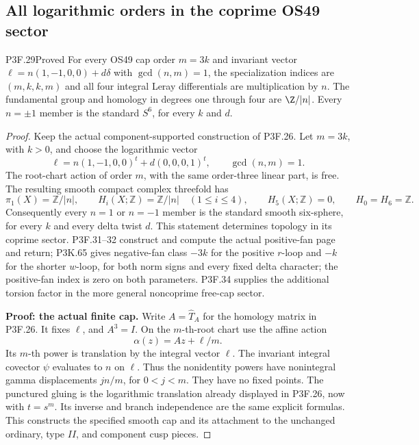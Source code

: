 \subsection{All logarithmic orders in the coprime OS49 sector}
\begin{statement}{P3F.29}{Proved}
For every OS49 cap order $m=3k$ and invariant vector $\ell=n(1,-1,0,0)+d\delta$ with $\gcd(n,m)=1$, the specialization indices are $(m,k,k,m)$ and all four integral Leray differentials are multiplication by $n$. The fundamental group and homology in degrees one through four are $\Z/|n|$. Every $n=\pm1$ member is the standard $S^6$, for every $k$ and $d$.
\end{statement}
\begin{proof}
Keep the actual component-supported construction of P3F.26. Let \(m=3k\), with \(k>0\), and choose the logarithmic vector \[
 \ell=n(1,-1,0,0)^t+d(0,0,0,1)^t,
 \qquad \gcd(n,m)=1.                                  \tag{P3F.29.1}
\] The root-chart action of order \(m\), with the same order-three linear part, is free. The resulting smooth compact complex threefold has \[
 \pi_1(X)=\mathbb Z/|n|,
 \qquad H_i(X;\mathbb Z)=\mathbb Z/|n|
       \quad(1\leq i\leq4),
 \qquad H_5(X;\mathbb Z)=0,
 \qquad H_0=H_6=\mathbb Z.                            \tag{P3F.29.2}
\] Consequently every \(n=1\) or \(n=-1\) member is the standard smooth six-sphere, for every \(k\) and every delta twist \(d\). This statement determines topology in its coprime sector. P3F.31--32 construct and compute the actual positive-fan page and return; P3K.65 gives negative-fan class \(-3k\) for the positive \(r\)-loop and \(-k\) for the shorter \(w\)-loop, for both norm signs and every fixed delta character; the positive-fan index is zero on both parameters. P3F.34 supplies the additional torsion factor in the more general noncoprime free-cap sector.

\textbf{Proof: the actual finite cap.} Write \(A=\widehat T_A\) for the homology matrix in P3F.26. It fixes \(\ell\), and \(A^3=I\). On the \(m\)-th-root chart use the affine action \[
 \alpha(z)=Az+\ell/m.
\] Its \(m\)-th power is translation by the integral vector \(\ell\). The invariant integral covector \(\psi\) evaluates to \(n\) on \(\ell\). Thus the nonidentity powers have nonintegral gamma displacements \(jn/m\), for \(0<j<m\). They have no fixed points. The punctured gluing is the logarithmic translation already displayed in P3F.26, now with \(t=s^m\). Its inverse and branch independence are the same explicit formulas. This constructs the specified smooth cap and its attachment to the unchanged ordinary, type \(II\), and component cusp pieces.


\end{proof}
